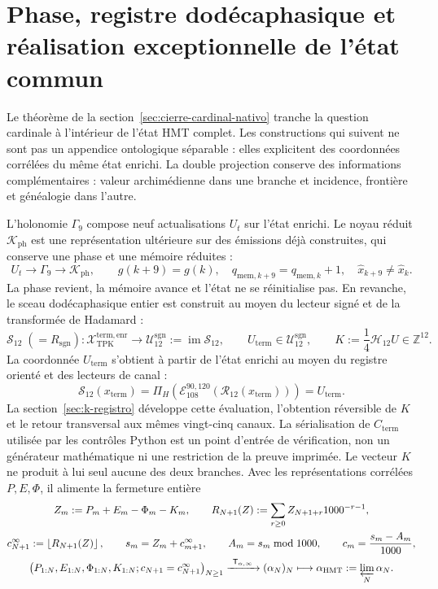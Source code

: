 \section{Phase, registre dodécaphasique et réalisation exceptionnelle de l'état commun}
\label{sec:testigos-descendentes-ch}

Le théorème de la section~\ref{sec:cierre-cardinal-nativo} tranche la question cardinale à l'intérieur de l'état HMT complet. Les constructions qui suivent ne sont pas un appendice ontologique séparable : elles explicitent des coordonnées corrélées du même état enrichi. La double projection conserve des informations complémentaires : valeur archimédienne dans une branche et incidence, frontière et généalogie dans l'autre.

L'holonomie \(\Gamma_9\) compose neuf actualisations \(U_t\) sur l'état enrichi. Le noyau réduit \(\mathcal K_{\mathrm{ph}}\) est une représentation ultérieure sur des émissions déjà construites, qui conserve une phase et une mémoire réduites :
\[
 U_t\longrightarrow\Gamma_9\longrightarrow\mathcal K_{\mathrm{ph}},
 \qquad
 g(k+9)=g(k),\quad
 q_{\mathrm{mem},k+9}=q_{\mathrm{mem},k}+1,\quad
 \widehat x_{k+9}\neq\widehat x_k.
\]
La phase revient, la mémoire avance et l’état ne se réinitialise pas. En revanche, le
sceau dodécaphasique entier est construit au moyen du lecteur signé et de la
transformée de Hadamard :
\[
 \mathcal S_{12}\;(=R_{\mathrm{sgn}}):
 \mathcal X_{\mathrm{TPK}}^{\mathrm{term,enr}}
 \longrightarrow
 \mathcal U_{12}^{\mathrm{sgn}}:=\operatorname{im}\mathcal S_{12},
 \qquad
 U_{\mathrm{term}}\in\mathcal U_{12}^{\mathrm{sgn}},
 \qquad
 K:=\frac14\mathcal H_{12}U\in\mathbb Z^{12}.
\]
La coordonnée \(U_{\mathrm{term}}\) s’obtient à partir de l’état enrichi au moyen
du registre orienté et des lecteurs de canal :
\[
 \mathcal S_{12}(x_{\mathrm{term}})
 =\Pi_H\!\left(
   \mathcal E_{108}^{90,120}
   (\mathcal R_{12}(x_{\mathrm{term}}))\right)
 =U_{\mathrm{term}}.
\]
La section~\ref{sec:k-registro} développe cette évaluation, l'obtention réversible de \(K\) et le retour transversal aux mêmes vingt-cinq canaux. La sérialisation de \(C_{\mathrm{term}}\) utilisée par les contrôles Python est un point d'entrée de vérification, non un générateur mathématique ni une restriction de la preuve imprimée. Le vecteur \(K\) ne produit à lui seul aucune des deux branches. Avec les représentations corrélées \(P,E,\Phi\), il alimente la fermeture entière
\[
 \begin{gathered}
 Z_m:=P_m+E_m-\Phi_m-K_m,\qquad
 R_{N+1}(Z):=\sum_{r\geq0}Z_{N+1+r}1000^{-r-1},\\
 c_{N+1}^{\infty}:=\left\lfloor R_{N+1}(Z)\right\rfloor,\qquad
 s_m=Z_m+c_{m+1}^{\infty},\qquad
 A_m=s_m\bmod1000,\qquad
 c_m=\frac{s_m-A_m}{1000},\\
 \bigl(P_{1:N},E_{1:N},\Phi_{1:N},K_{1:N};
       c_{N+1}=c_{N+1}^{\infty}\bigr)_{N\geq1}
 \xrightarrow{\ \mathsf T_{\alpha,\infty}\ }
 (\alpha_N)_N
 \longmapsto
 \alpha_{\mathrm{HMT}}:=\varprojlim_N\alpha_N.
 \end{gathered}
\]
